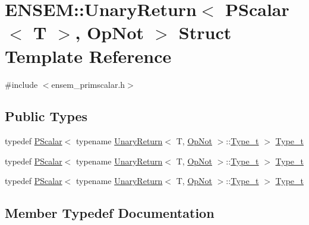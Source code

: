 \hypertarget{structENSEM_1_1UnaryReturn_3_01PScalar_3_01T_01_4_00_01OpNot_01_4}{}\section{E\+N\+S\+EM\+:\+:Unary\+Return$<$ P\+Scalar$<$ T $>$, Op\+Not $>$ Struct Template Reference}
\label{structENSEM_1_1UnaryReturn_3_01PScalar_3_01T_01_4_00_01OpNot_01_4}


{\ttfamily \#include $<$ensem\+\_\+primscalar.\+h$>$}

\subsection*{Public Types}
\begin{DoxyCompactItemize}
\item 
typedef \mbox{\hyperlink{classENSEM_1_1PScalar}{P\+Scalar}}$<$ typename \mbox{\hyperlink{structENSEM_1_1UnaryReturn}{Unary\+Return}}$<$ T, \mbox{\hyperlink{structENSEM_1_1OpNot}{Op\+Not}} $>$\+::\mbox{\hyperlink{structENSEM_1_1UnaryReturn_3_01PScalar_3_01T_01_4_00_01OpNot_01_4_a7612702a79b74f223457b785dbd77b2b}{Type\+\_\+t}} $>$ \mbox{\hyperlink{structENSEM_1_1UnaryReturn_3_01PScalar_3_01T_01_4_00_01OpNot_01_4_a7612702a79b74f223457b785dbd77b2b}{Type\+\_\+t}}
\item 
typedef \mbox{\hyperlink{classENSEM_1_1PScalar}{P\+Scalar}}$<$ typename \mbox{\hyperlink{structENSEM_1_1UnaryReturn}{Unary\+Return}}$<$ T, \mbox{\hyperlink{structENSEM_1_1OpNot}{Op\+Not}} $>$\+::\mbox{\hyperlink{structENSEM_1_1UnaryReturn_3_01PScalar_3_01T_01_4_00_01OpNot_01_4_a7612702a79b74f223457b785dbd77b2b}{Type\+\_\+t}} $>$ \mbox{\hyperlink{structENSEM_1_1UnaryReturn_3_01PScalar_3_01T_01_4_00_01OpNot_01_4_a7612702a79b74f223457b785dbd77b2b}{Type\+\_\+t}}
\item 
typedef \mbox{\hyperlink{classENSEM_1_1PScalar}{P\+Scalar}}$<$ typename \mbox{\hyperlink{structENSEM_1_1UnaryReturn}{Unary\+Return}}$<$ T, \mbox{\hyperlink{structENSEM_1_1OpNot}{Op\+Not}} $>$\+::\mbox{\hyperlink{structENSEM_1_1UnaryReturn_3_01PScalar_3_01T_01_4_00_01OpNot_01_4_a7612702a79b74f223457b785dbd77b2b}{Type\+\_\+t}} $>$ \mbox{\hyperlink{structENSEM_1_1UnaryReturn_3_01PScalar_3_01T_01_4_00_01OpNot_01_4_a7612702a79b74f223457b785dbd77b2b}{Type\+\_\+t}}
\end{DoxyCompactItemize}


\subsection{Member Typedef Documentation}
\mbox{\label{structENSEM_1_1UnaryReturn_3_01PScalar_3_01T_01_4_00_01OpNot_01_4_a7612702a79b74f223457b785dbd77b2b}} 
